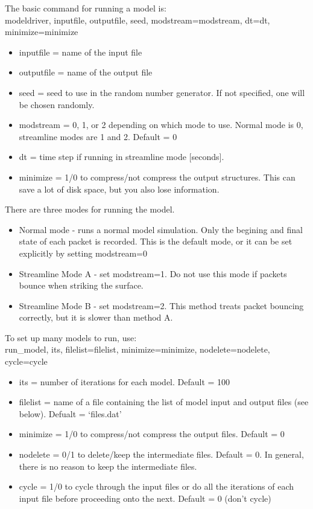 \documentclass[11pt]{article}
\begin{document}
The basic command for running a model is: \\
\hspace*{1cm}modeldriver, inputfile, outputfile, seed, modstream=modstream, dt=dt,
minimize=minimize 
\begin{itemize}
\item inputfile = name of the input file
\item outputfile = name of the output file
\item {\color{red}seed} = seed to use in the random number generator. If not
specified, one will be chosen randomly.
\item {\color{red}modstream} = 0, 1, or 2 depending on which mode to use. 
Normal mode is 0, streamline modes are 1 and 2. Default = 0
\item dt = time step if running in streamline mode [seconds]. 
\item {\color{red}minimize} = 1/0 to compress/not compress the output 
structures. This can save a lot of disk space, but you also lose information.
\end{itemize}

There are three modes for running the model. 
\begin{itemize}
\item Normal mode - runs a normal model simulation. Only the begining and final
state of each packet is recorded. This is the default mode, or it can be set
explicitly by setting modstream=0
\item Streamline Mode A - set modstream=1. Do not use this mode if packets
bounce when striking the surface. 
\item Streamline Mode B - set modstream=2. This method treats packet bouncing
correctly, but it is slower than method A.
\end{itemize}

To set up many models to run, use:\\
\hspace*{1cm}run\_model, its, filelist=filelist, minimize=minimize,
nodelete=nodelete, cycle=cycle
\begin{itemize}
\item {\color{red}its} = number of iterations for each model. Default = 100
\item {\color{red}filelist} = name of a file containing the list of model input
and output files (see below). Defualt = `files.dat'
\item {\color{red}minimize} = 1/0 to compress/not compress the output files.
Default = 0
\item {\color{red}nodelete} = 0/1 to delete/keep the intermediate files.
Default = 0. In general, there is no reason to keep the intermediate files.
\item {\color{red}cycle} = 1/0 to cycle through the input files or do all the
iterations of each input file before proceeding onto the next. Default = 0
(don't cycle)
\end{itemize}
\end{document}
